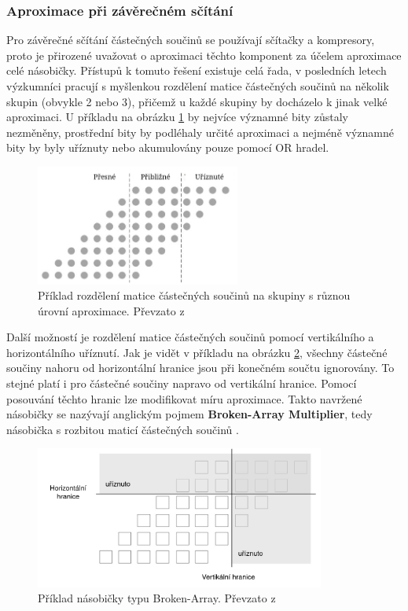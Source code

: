 \subsubsection{Aproximace při závěrečném sčítání}
Pro závěrečné sčítání částečných součinů se používají sčítačky a kompresory, proto je přirozené uvažovat o aproximaci těchto komponent za účelem aproximace celé násobičky. Přístupů k tomuto řešení existuje celá řada, v posledních letech výzkumníci pracují s myšlenkou rozdělení matice částečných součinů na několik skupin (obvykle 2 nebo 3), přičemž u každé skupiny by docházelo k jinak velké aproximaci. U příkladu na obrázku \ref{fig:accumulation_approx} by nejvíce významné bity zůstaly nezměněny, prostřední bity by podléhaly určité aproximaci a nejméně významné bity by byly uříznuty nebo akumulovány pouze pomocí OR hradel.

\begin{figure}[H]
    \centering
    \includegraphics[width=0.6\textwidth]{obrazky-figures/accumulation_approx.png}
    \caption{Příklad rozdělení matice částečných součinů na skupiny s různou úrovní aproximace. Převzato z \cite{approx_mult_survey}}
    \label{fig:accumulation_approx}
\end{figure}

Další možností je rozdělení matice částečných součinů pomocí vertikálního a horizontálního uříznutí. Jak je vidět v příkladu na obrázku \ref{fig:bam}, všechny částečné součiny nahoru od horizontální hranice jsou při konečném součtu ignorovány. To stejné platí i pro částečné součiny napravo od vertikální hranice. Pomocí posouvání těchto hranic lze modifikovat míru aproximace. Takto navržené násobičky se nazývají anglickým pojmem \textbf{Broken-Array Multiplier}, tedy násobička s rozbitou maticí částečných součinů \cite{bio_inspired_blocks}. 

\begin{figure}[H]
    \centering
    \includegraphics[width=0.85\textwidth]{obrazky-figures/bam.png}
    \caption{Příklad násobičky typu Broken-Array. Převzato z \cite{bio_inspired_blocks}}
    \label{fig:bam}
\end{figure}

